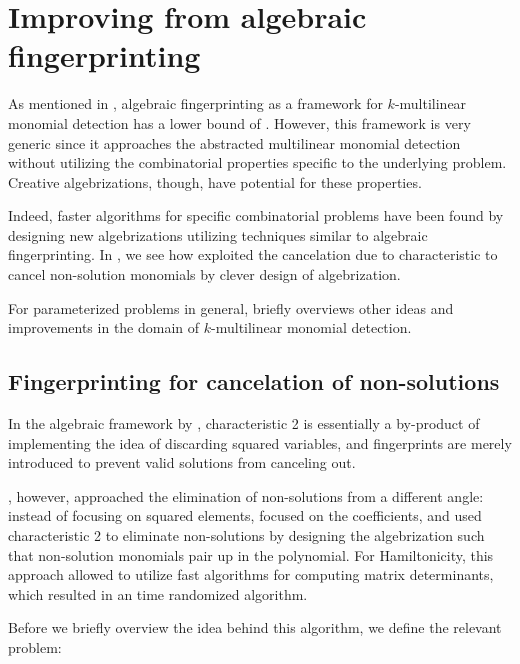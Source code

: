 \section{Improving from algebraic fingerprinting}
\label{sect:improvements}

As mentioned in , 
algebraic fingerprinting as a framework 
for $k$-multilinear monomial detection has a lower bound of . 
However, this framework is very generic since it 
approaches the abstracted multilinear monomial detection without 
utilizing the combinatorial properties specific to the underlying problem. 
Creative algebrizations, though, 
have potential for these properties.

Indeed, faster algorithms for specific combinatorial problems 
have been found by designing new algebrizations utilizing techniques 
similar to algebraic fingerprinting. In , 
we see how \textcite{Björklund14} 
exploited the cancelation due to characteristic to cancel non-solution monomials 
by clever design of algebrization. 

For parameterized problems in general, 
briefly overviews other ideas and 
improvements in the domain of $k$-multilinear monomial detection.

\subsection{Fingerprinting for cancelation of non-solutions}
\label{sect:cancel_nonsolutions}

In the algebraic framework by \citeauthor{KouWil09}, 
characteristic 2 is essentially a by-product of implementing 
the idea of discarding squared variables, and fingerprints are merely 
introduced to prevent valid solutions from canceling out.

\textcite{Björklund14}, however, approached the elimination of 
non-solutions from a different angle: instead of focusing on squared elements, 
\citeauthor{Björklund14} focused on the coefficients, 
and used characteristic 2 to eliminate non-solutions by designing 
the algebrization such that non-solution monomials pair up in the polynomial. 
For Hamiltonicity, this approach allowed \citeauthor{Björklund14} to utilize 
fast algorithms for computing matrix determinants, which resulted in an 
 time randomized algorithm.

Before we briefly overview the idea behind this algorithm, we define the 
relevant problem:
\begin{problem}
\end{problem}

